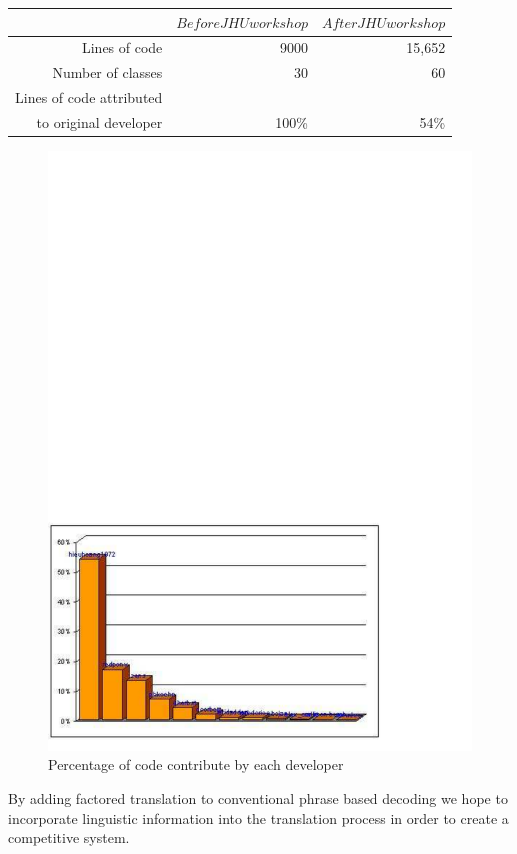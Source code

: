 \documentclass[10pt]{report}
\theoremstyle{plain}
\begin{document}
{\begin{tabular}{|r|r|r|}
\hline
$ $&$ Before JHU workshop $&$ After JHU workshop $\\
\hline
Lines of code	& 9000	& 15,652\\
Number of classes	& 30	& 60\\
Lines of code attributed & & \\
to original developer	& 100\%	& 54\%\\
\hline
\end{tabular}

\begin{figure}[h]
\centering
\includegraphics[scale=1]{hieu-1}
\caption{Percentage of code contribute by each developer}
\end{figure}

By adding factored translation to conventional phrase based decoding we hope to incorporate linguistic information into the translation process in order to create a competitive system.\\

}
\end{document}
